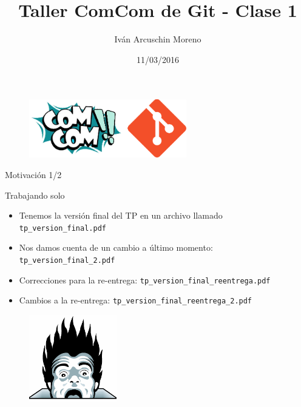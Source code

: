 \documentclass{beamer}
\title[Taller ComCom de Git - Clase 1]{Taller ComCom de Git - Clase 1}
\author[Iván Arcuschin]{Iván Arcuschin Moreno}
\institute{ComCom - DC - FCEyN - UBA}
\date{11/03/2016}
\begin{document}
\begin{frame}
  \titlepage
  \begin{figure}[ht]
      \begin{center}
          \includegraphics[height=1in]{images/logo-taller.png}
      \end{center}
  \end{figure}
\end{frame}

\begin{frame}{Motivación 1/2}

    \begin{block}{Trabajando solo}
        \begin{itemize}
            \item Tenemos la versión final del TP en un archivo llamado \texttt{tp\_version\_final.pdf}
            \pause
            \item Nos damos cuenta de un cambio a último momento: \texttt{tp\_version\_final\_2.pdf}
            \pause
            \item Correcciones para la re-entrega: \texttt{tp\_version\_final\_reentrega.pdf}
            \pause
            \item Cambios a la re-entrega: \texttt{tp\_version\_final\_reentrega\_2.pdf}
        \end{itemize}
    \end{block}

    \pause
    \begin{figure}[ht]
        \begin{center}
            \includegraphics[height=1.5in]{images/horror.png}
        \end{center}
    \end{figure}

\end{frame}
\end{document}
